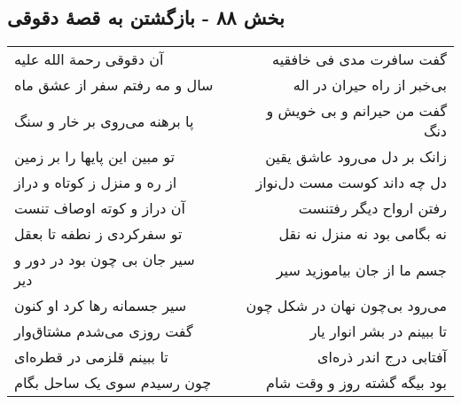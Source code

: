 \begin{center}
\section*{بخش ۸۸ - بازگشتن به قصهٔ دقوقی}
\label{sec:sh088}
\begin{longtable}{l p{0.5cm} r}
آن دقوقی رحمة الله علیه
&&
گفت سافرت مدی فی خافقیه
\\
سال و مه رفتم سفر از عشق ماه
&&
بی‌خبر از راه حیران در اله
\\
پا برهنه می‌روی بر خار و سنگ
&&
گفت من حیرانم و بی خویش و دنگ
\\
تو مبین این پایها را بر زمین
&&
زانک بر دل می‌رود عاشق یقین
\\
از ره و منزل ز کوتاه و دراز
&&
دل چه داند کوست مست دل‌نواز
\\
آن دراز و کوته اوصاف تنست
&&
رفتن ارواح دیگر رفتنست
\\
تو سفرکردی ز نطفه تا بعقل
&&
نه بگامی بود نه منزل نه نقل
\\
سیر جان بی چون بود در دور و دیر
&&
جسم ما از جان بیاموزید سیر
\\
سیر جسمانه رها کرد او کنون
&&
می‌رود بی‌چون نهان در شکل چون
\\
گفت روزی می‌شدم مشتاق‌وار
&&
تا ببینم در بشر انوار یار
\\
تا ببینم قلزمی در قطره‌ای
&&
آفتابی درج اندر ذره‌ای
\\
چون رسیدم سوی یک ساحل بگام
&&
بود بیگه گشته روز و وقت شام
\\
\end{longtable}
\end{center}
